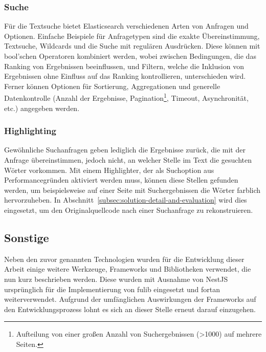 \subsubsection{Suche}
Für die Textsuche bietet Elasticsearch verschiedenen Arten von Anfragen und Optionen.
Einfache Beispiele für Anfragetypen sind die exakte Übereinstimmung, Textsuche, Wildcards und die Suche mit regulären Ausdrücken.\cite{elastic-query-dsl}
Diese können mit bool'schen Operatoren kombiniert werden, wobei zwischen Bedingungen, die das Ranking von Ergebnissen beeinflussen, und Filtern, welche die Inklusion von Ergebnissen ohne Einfluss auf das Ranking kontrollieren, unterschieden wird.\cite{elastic-bool-query}
Ferner können Optionen für Sortierung, Aggregationen und generelle Datenkontrolle (Anzahl der Ergebnisse, Pagination\footnote{Aufteilung von einer großen Anzahl von Suchergebnissen (>1000) auf mehrere Seiten.}, Timeout, Asynchronität, etc.) angegeben werden.\cite{elastic-search-data}

\subsubsection{Highlighting}
Gewöhnliche Suchanfragen geben lediglich die Ergebnisse zurück, die mit der Anfrage übereinstimmen, jedoch nicht, an welcher Stelle im Text die gesuchten Wörter vorkommen.
Mit einem Highlighter, der als Suchoption aus Performancegründen aktiviert werden muss, können diese Stellen gefunden werden, um beispielsweise auf einer Seite mit Suchergebnissen die Wörter farblich hervorzuheben.\cite{elastic-highlighting}
In Abschnitt~\ref{subsec:solution-detail-and-evaluation} wird dies eingesetzt, um den Originalquellcode nach einer Suchanfrage zu rekonstruieren.

\subsection{Sonstige}\label{subsec:other-libraries}

Neben den zuvor genannten Technologien wurden für die Entwicklung dieser Arbeit einige weitere Werkzeuge, Frameworks und Bibliotheken verwendet, die nun kurz beschrieben werden.
Diese wurden mit Ausnahme von NestJS ursprünglich für die Implementierung von fulib eingesetzt und fortan weiterverwendet.
Aufgrund der umfänglichen Auswirkungen der Frameworks auf den Entwicklungsprozess lohnt es sich an dieser Stelle erneut darauf einzugehen.

